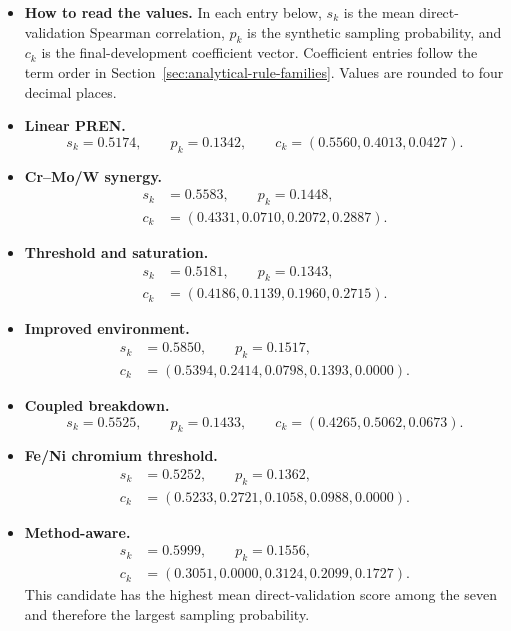 \documentclass[11pt]{article}
\newenvironment{notes}
  {\begin{itemize}\setlength{\itemsep}{0.45em}\setlength{\parsep}{0pt}}
  {\end{itemize}}
\begin{document}
\begin{notes}
    \item \textbf{How to read the values.}
    In each entry below, \(s_k\) is the mean direct-validation
    Spearman correlation, \(p_k\) is the synthetic sampling
    probability, and \(c_k\) is the final-development
    coefficient vector. Coefficient entries follow the term
    order in Section~\ref{sec:analytical-rule-families}.
    Values are rounded to four decimal places.

    \item \textbf{Linear PREN.}
    \[
        s_k=0.5174,\qquad p_k=0.1342,\qquad
        c_k=(0.5560,0.4013,0.0427).
    \]

    \item \textbf{Cr--Mo/W synergy.}
    \[
    \begin{aligned}
        s_k&=0.5583,\qquad p_k=0.1448,\\
        c_k&=(0.4331,0.0710,0.2072,0.2887).
    \end{aligned}
    \]

    \item \textbf{Threshold and saturation.}
    \[
    \begin{aligned}
        s_k&=0.5181,\qquad p_k=0.1343,\\
        c_k&=(0.4186,0.1139,0.1960,0.2715).
    \end{aligned}
    \]

    \item \textbf{Improved environment.}
    \[
    \begin{aligned}
        s_k&=0.5850,\qquad p_k=0.1517,\\
        c_k&=(0.5394,0.2414,0.0798,0.1393,0.0000).
    \end{aligned}
    \]

    \item \textbf{Coupled breakdown.}
    \[
        s_k=0.5525,\qquad p_k=0.1433,\qquad
        c_k=(0.4265,0.5062,0.0673).
    \]

    \item \textbf{Fe/Ni chromium threshold.}
    \[
    \begin{aligned}
        s_k&=0.5252,\qquad p_k=0.1362,\\
        c_k&=(0.5233,0.2721,0.1058,0.0988,0.0000).
    \end{aligned}
    \]

    \item \textbf{Method-aware.}
    \[
    \begin{aligned}
        s_k&=0.5999,\qquad p_k=0.1556,\\
        c_k&=(0.3051,0.0000,0.3124,0.2099,0.1727).
    \end{aligned}
    \]
    This candidate has the highest mean direct-validation
    score among the seven and therefore the largest
    sampling probability.


\end{notes}
\end{document}
